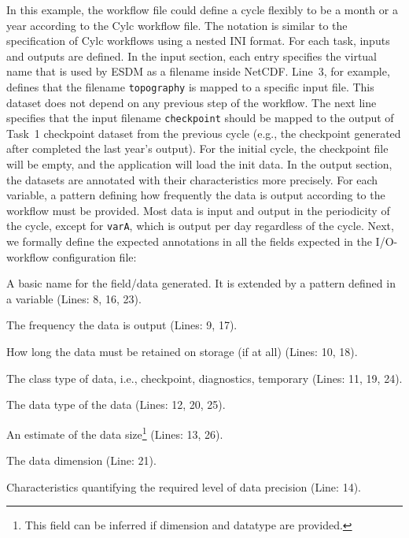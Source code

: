 \documentclass{superfri}
\begin{document}
In this example, the workflow file could define a cycle flexibly to be a month or a year according to the Cylc workflow file.
The notation is similar to the specification of Cylc workflows using a nested INI format.
For each task, inputs and outputs are defined.
In the input section, each entry specifies the virtual name that is used by ESDM as a filename inside NetCDF.
Line~3, for example, defines that the filename \texttt{topography} is mapped to a specific input file.
This dataset does not depend on any previous step of the workflow.
The next line specifies that the input filename \texttt{checkpoint} should be mapped to the output of Task~1 checkpoint dataset from the previous cycle (e.g., the checkpoint generated after completed the last year's output).
For the initial cycle, the checkpoint file will be empty, and the application will load the init data.
In the output section, the datasets are annotated with their characteristics more precisely.
For each variable, a pattern defining how frequently the data is output according to the workflow must be provided.
Most data is input and output in the periodicity of the cycle, except for \texttt{varA}, which is output per day regardless of the cycle.
Next, we formally define the expected annotations in all the fields expected in the I/O-workflow configuration file:

\begin{description}[itemsep=0pt]
  \item[Name] A basic name for the field/data generated. It is extended by a pattern defined in a variable (Lines: 8, 16, 23).

  \item[Pattern] The frequency the data is output (Lines: 9, 17).

  \item[Lifetime] How long the data must be retained on storage (if at all) (Lines: 10, 18).

  \item[Type] The class type of data, i.e., checkpoint, diagnostics, temporary (Lines: 11, 19, 24).

  \item[Datatype] The data type of the data (Lines: 12, 20, 25).

  \item[Size] An estimate of the data size\footnote{This field can be inferred if dimension and datatype are provided.} (Lines: 13, 26).

  \item[Dimension] The data dimension (Line: 21).

  \item[Accuracy] Characteristics quantifying the required level of data precision (Line: 14).

\end{description}
\end{document}
